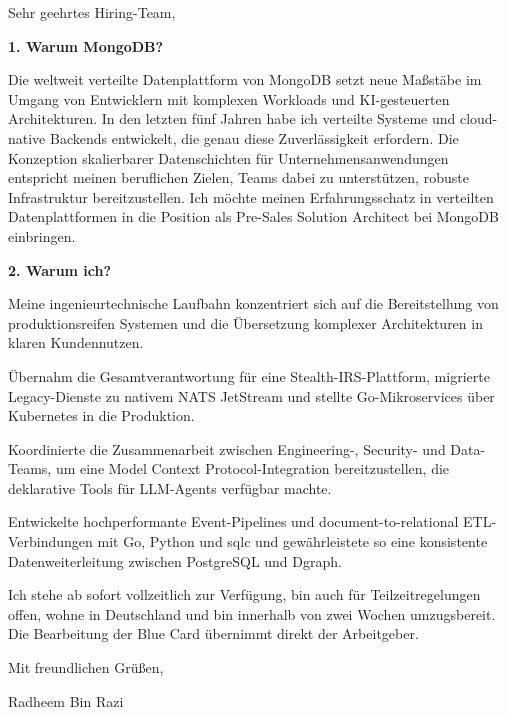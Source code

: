 \documentclass[11pt,a4paper]{coverletter}
\begin{document}
\opening{Sehr geehrtes Hiring-Team,}

\vspace{8pt}\noindent\textbf{1. Warum MongoDB?}\par\vspace{3pt}

Die weltweit verteilte Datenplattform von MongoDB setzt neue Maßstäbe im Umgang von Entwicklern mit komplexen Workloads und KI-gesteuerten Architekturen. In den letzten fünf Jahren habe ich verteilte Systeme und cloud-native Backends entwickelt, die genau diese Zuverlässigkeit erfordern. Die Konzeption skalierbarer Datenschichten für Unternehmensanwendungen entspricht meinen beruflichen Zielen, Teams dabei zu unterstützen, robuste Infrastruktur bereitzustellen. Ich möchte meinen Erfahrungsschatz in verteilten Datenplattformen in die Position als Pre-Sales Solution Architect bei MongoDB einbringen.

\vspace{8pt}\noindent\textbf{2. Warum ich?}\par\vspace{3pt}

Meine ingenieurtechnische Laufbahn konzentriert sich auf die Bereitstellung von produktionsreifen Systemen und die Übersetzung komplexer Architekturen in klaren Kundennutzen.

\bullets

  \item Übernahm die Gesamtverantwortung für eine Stealth-IRS-Plattform, migrierte Legacy-Dienste zu nativem NATS JetStream und stellte Go-Mikroservices über Kubernetes in die Produktion.

  \item Koordinierte die Zusammenarbeit zwischen Engineering-, Security- und Data-Teams, um eine Model Context Protocol-Integration bereitzustellen, die deklarative Tools für LLM-Agents verfügbar machte.

  \item Entwickelte hochperformante Event-Pipelines und document-to-relational ETL-Verbindungen mit Go, Python und sqlc und gewährleistete so eine konsistente Datenweiterleitung zwischen PostgreSQL und Dgraph.

\bulletsend

Ich stehe ab sofort vollzeitlich zur Verfügung, bin auch für Teilzeitregelungen offen, wohne in Deutschland und bin innerhalb von zwei Wochen umzugsbereit. Die Bearbeitung der Blue Card übernimmt direkt der Arbeitgeber.

\closing{Mit freundlichen Grüßen,}{Radheem Bin Razi}
\end{document}
